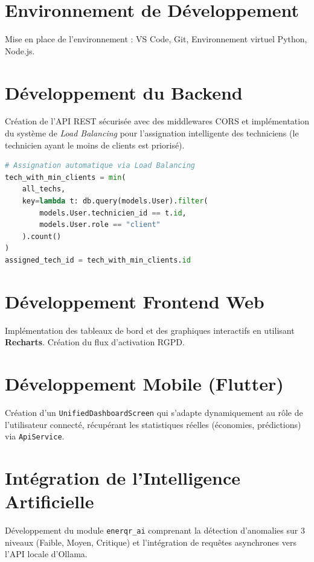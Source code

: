 \documentclass[12pt, a4paper, twoside]{report}
\begin{document}
\section{Environnement de Développement}
Mise en place de l'environnement : VS Code, Git, Environnement virtuel Python, Node.js.

\section{Développement du Backend}
Création de l'API REST sécurisée avec des middlewares CORS et implémentation du système de \textit{Load Balancing} pour l'assignation intelligente des techniciens (le technicien ayant le moins de clients est priorisé).

\begin{lstlisting}[language=Python, caption=Extrait du Load Balancing dans FastAPI]
# Assignation automatique via Load Balancing
tech_with_min_clients = min(
    all_techs,
    key=lambda t: db.query(models.User).filter(
        models.User.technicien_id == t.id,
        models.User.role == "client"
    ).count()
)
assigned_tech_id = tech_with_min_clients.id
\end{lstlisting}

\section{Développement Frontend Web}
Implémentation des tableaux de bord et des graphiques interactifs en utilisant \textbf{Recharts}.
Création du flux d'activation RGPD.

\section{Développement Mobile (Flutter)}
Création d'un \texttt{UnifiedDashboardScreen} qui s'adapte dynamiquement au rôle de l'utilisateur connecté, récupérant les statistiques réelles (économies, prédictions) via \texttt{ApiService}.

\section{Intégration de l'Intelligence Artificielle}
Développement du module \texttt{enerqr\_ai} comprenant la détection d'anomalies sur 3 niveaux (Faible, Moyen, Critique) et l'intégration de requêtes asynchrones vers l'API locale d'Ollama.

\end{document}
